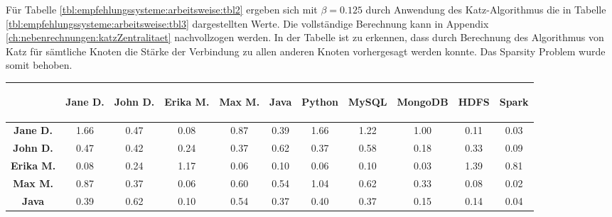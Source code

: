 Für Tabelle \ref{tbl:empfehlungssysteme:arbeitsweise:tbl2} ergeben sich mit $\beta = 0.125$ durch Anwendung des Katz-Algorithmus die in Tabelle \ref{tbl:empfehlungssysteme:arbeitsweise:tbl3} dargestellten Werte. Die vollständige Berechnung kann in Appendix \ref{ch:nebenrechnungen:katzZentralitaet} nachvollzogen werden. In der Tabelle ist zu erkennen, dass durch Berechnung des Algorithmus von Katz für sämtliche Knoten die Stärke der Verbindung zu allen anderen Knoten vorhergesagt werden konnte. Das Sparsity Problem wurde somit behoben.

\begin{table}[h]
	\centering
	\begin{tabular}{c|c|c|c|c|c|c|c|c|c|c}
		& \begin{sideways}\textbf{Jane D.}\end{sideways} & \begin{sideways}\textbf{John D.}\end{sideways} & \begin{sideways}\textbf{Erika M.}\end{sideways} & \begin{sideways}\textbf{Max M.}\end{sideways} & \begin{sideways}\textbf{Java}\end{sideways} & \begin{sideways}\textbf{Python}\end{sideways} & \begin{sideways}\textbf{MySQL}\end{sideways} & \begin{sideways}\textbf{MongoDB}\end{sideways} & \begin{sideways}\textbf{HDFS}\end{sideways} & \begin{sideways}\textbf{Spark}\end{sideways} \\ 
		\hline
		\textbf{Jane D.}  & 1.66 & 0.47 & 0.08 & 0.87 & 0.39 & 1.66 & 1.22 & 1.00 & 0.11 & 0.03\\
		\textbf{John D.}  & 0.47 & 0.42 & 0.24 & 0.37 & 0.62 & 0.37 & 0.58 & 0.18 & 0.33 & 0.09\\
		\textbf{Erika M.} & 0.08 & 0.24 & 1.17 & 0.06 & 0.10 & 0.06 & 0.10 & 0.03 & 1.39 & 0.81\\
		\textbf{Max M.}   & 0.87 & 0.37 & 0.06 & 0.60 & 0.54 & 1.04 & 0.62 & 0.33 & 0.08 & 0.02\\
		\textbf{Java}     & 0.39 & 0.62 & 0.10 & 0.54 & 0.37 & 0.40 & 0.37 & 0.15 & 0.14 & 0.04\\

\end{tabular}
\end{table}
